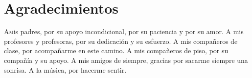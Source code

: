 \chapter*{Agradecimientos}
\pagestyle{empty}

\lettrine[lraise=-0.1, lines=2, loversize=0.25]{A} mis padres, por su apoyo incondicional, por su paciencia y por su amor.
A mis profesores y profesoras, por su dedicación y su esfuerzo.
A mis compañeros de clase, por acompañarme en este camino.
A mis compañeros de piso, por su compañía y su apoyo.
A mis amigos de siempre, gracias por sacarme siempre una sonrisa.
A la música, por hacerme sentir.




{}%
\vspace{-.3cm}
{}%
{}%
